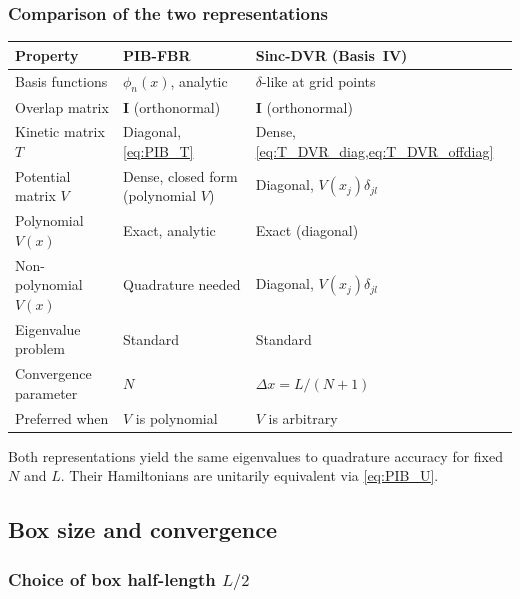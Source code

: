 \subsubsection{Comparison of the two representations}

\begin{center}
\renewcommand{\arraystretch}{1.5}
\begin{tabular}{lll}
  \toprule
  Property & PIB-FBR & Sinc-DVR (Basis~IV) \\
  \midrule
  Basis functions & $\phi_n(x)$, analytic & $\delta$-like at grid points \\
  Overlap matrix & $\mathbf{I}$ (orthonormal) & $\mathbf{I}$ (orthonormal) \\
  Kinetic matrix $T$ & Diagonal, \cref{eq:PIB_T} & Dense, \cref{eq:T_DVR_diag,eq:T_DVR_offdiag} \\
  Potential matrix $V$ & Dense, closed form (polynomial $V$) & Diagonal, $V(x_j)\delta_{jl}$ \\
  Polynomial $V(x)$ & Exact, analytic & Exact (diagonal) \\
  Non-polynomial $V(x)$ & Quadrature needed & Diagonal, $V(x_j)\delta_{jl}$ \\
  Eigenvalue problem & Standard & Standard \\
  Convergence parameter & $N$ & $\Delta x = L/(N+1)$ \\
  Preferred when & $V$ is polynomial & $V$ is arbitrary \\
  \bottomrule
\end{tabular}
\end{center}

Both representations yield the same eigenvalues to quadrature accuracy for
fixed $N$ and $L$.  Their Hamiltonians are unitarily equivalent via \cref{eq:PIB_U}.

\subsection{Box size and convergence}\label{sec:PIB_conv}

\subsubsection{Choice of box half-length $L/2$}

